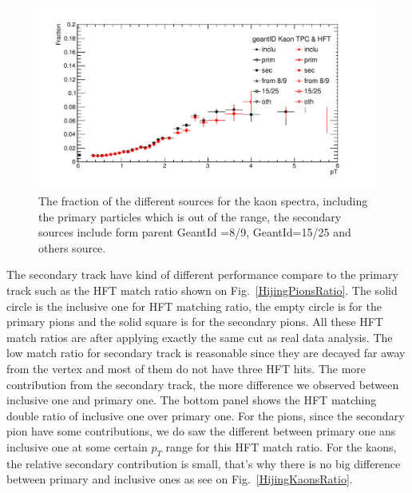\begin{figure}[htbp]
\centering
\includegraphics[keepaspectratio,width=1.0\textwidth,angle=0]{figure/Run14_D0HFT/Fraction_Kaon-eps-converted-to.pdf}
\caption{The fraction of the different sources for the kaon spectra, including the primary particles which is out of the range, the secondary sources include form parent GeantId =8/9, GeantId=15/25 and others source.}
\label{Fraction_Kaon}
\end{figure}


The secondary track have kind of different performance compare to the primary track such as the HFT match ratio shown on Fig.~\ref{HijingPionsRatio}. The solid circle is the inclusive one for HFT matching ratio, the empty circle is for the primary pions and the solid square is for the secondary pions. All these HFT match ratios are after applying exactly the same cut as real data analysis. The low match ratio for secondary track is reasonable since they are decayed far away from the vertex and most of them do not have three HFT hits. The more contribution from the secondary track, the more difference we observed between inclusive one and primary one. The bottom panel shows the HFT matching double ratio of inclusive one over primary one. For the pions, since the secondary pion have some contributions, we do saw the different between primary one ans inclusive one at some certain $p_T$ range for this HFT match ratio. For the kaons, the relative secondary contribution is small, that's why there is no big difference between primary and inclusive ones as see on Fig.~\ref{HijingKaonsRatio}. 

